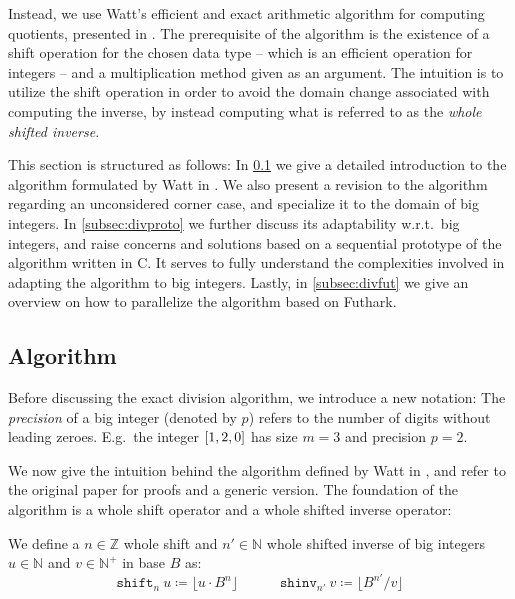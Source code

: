 Instead, we use Watt's efficient and exact arithmetic algorithm for computing
quotients, presented in \cite{watt2023efficient}. The prerequisite of the
algorithm is the existence of a shift operation for the chosen data type -- which
is an efficient operation for integers -- and a multiplication method given as an
argument. The intuition is to utilize the shift operation in order to avoid the
domain change associated with computing the inverse, by instead computing what
is referred to as the \textit{whole shifted inverse}.

This section is structured as follows: In \ref{subsec:divalg} we give a detailed
introduction to the algorithm formulated by Watt in \cite{watt2023efficient}. We
also present a revision to the algorithm regarding an unconsidered corner case,
and specialize it to the domain of big integers. In \ref{subsec:divproto} we
further discuss its adaptability w.r.t.\ big integers, and raise concerns and
solutions based on a sequential prototype of the algorithm written in C. It
serves to fully understand the complexities involved in adapting the algorithm
to big integers. Lastly, in \ref{subsec:divfut} we give an overview on how to
parallelize the algorithm based on Futhark.

\subsection{Algorithm}
\label{subsec:divalg}

Before discussing the exact division algorithm, we introduce a new notation: The
\textit{precision} of a big integer (denoted by $p$) refers to the number of
digits without leading zeroes. E.g.\ the integer $\mathtt{[}1,2,0\mathtt{]}$ has size $m=3$
and precision $p=2$.

We now give the intuition behind the algorithm defined by Watt in
\cite{watt2023efficient}, and refer to the original paper for proofs and a
generic version. The foundation of the algorithm is a whole shift operator and a
whole shifted inverse operator:

\begin{definition}\label{def:shifts}
  We define a $n \in \mathbb{Z}$ whole shift and $n' \in \mathbb{N}$ whole shifted inverse of big
  integers $u\in \mathbb{N}$ and $v\in \mathbb{N}^{+}$ in base $B$ as:
  \begin{equation}\label{eq:shifts}
    \mathtt{shift}_n~u \coloneq \lfloor u \cdot B^n \rfloor \quad \qquad \mathtt{shinv}_{n'}~v \coloneq \lfloor B^{n'}/ v \rfloor
    \end{equation}
\end{definition}

